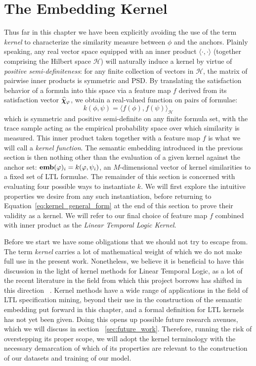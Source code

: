 \documentclass[titlepage,a4paper,11pt]{report}
\begin{document}
    \section{The Embedding Kernel}\label{sec:the_embedding_kernel}
    Thus far in this chapter we have been explicitly avoiding the use of the term \emph{kernel} to characterize the similarity measure between $\phi$ and the anchors. Plainly speaking, any real vector space equipped with an inner product $\langle \cdot, \cdot \rangle$ (together comprising the Hilbert space $\mathcal{H}$) will naturally induce a kernel by virtue of \emph{positive semi-definiteness}: for any finite collection of vectors in $\mathcal{H}$, the matrix of pairwise inner products is symmetric and PSD. By translating the satisfaction behavior of a formula into this space via a feature map $f$ derived from its satisfaction vector $\bm{\widehat\chi}_\varphi$, we obtain a real-valued function on pairs of formulae:
    \begin{equation} \label{eq:kernel_general_form}
        k(\phi, \psi) = \bigl\langle f(\phi), f(\psi)\bigr\rangle_\mathcal{H}
    \end{equation}
    which is symmetric and positive semi-definite on any finite formula set, with the trace sample acting as the empirical probability space over which similarity is measured. This inner product taken together with a feature map $f$ is what we will call a \textit{kernel function}. The semantic embedding introduced in the previous section is then nothing other than the evaluation of a given kernel against the anchor set: $\textbf{emb}(\varphi)_i = k(\varphi, \psi_i)$, an $M$-dimensional vector of kernel similarities to a fixed set of LTL formulae. The remainder of this section is concerned with evaluating four possible ways to instantiate $k$. We will first explore the intuitive properties we desire from any such instantiation, before returning to Equation~\ref{eq:kernel_general_form} at the end of this section to prove their validity as a kernel. We will refer to our final choice of feature map $f$ combined with inner product as the \emph{Linear Temporal Logic Kernel}.
    
    Before we start we have some obligations that we should not try to escape from. The term \emph{kernel} carries a lot of mathematical weight of which we do not make full use in the present work. Nonetheless, we believe it is beneficial to have this discussion in the light of kernel methods for Linear Temporal Logic, as a lot of the recent literature in the field from which this project borrows has shifted in this direction ~\citep{bortolussi_kernel_2020,bortolussi_learning_2022,candussio_bridging_2025,saveri_stl2vec_2024}. Kernel methods have a wide range of applications in the field of LTL specification mining, beyond their use in the construction of the semantic embedding put forward in this chapter, and a formal definition for LTL kernels has not yet been given. Doing this opens up possible future research avenues, which we will discuss in section ~\ref{sec:future_work}. Therefore, running the risk of overstepping its proper scope, we will adopt the kernel terminology with the necessary demarcation of which of its properties are relevant to the construction of our datasets and training of our model. 
\end{document}
